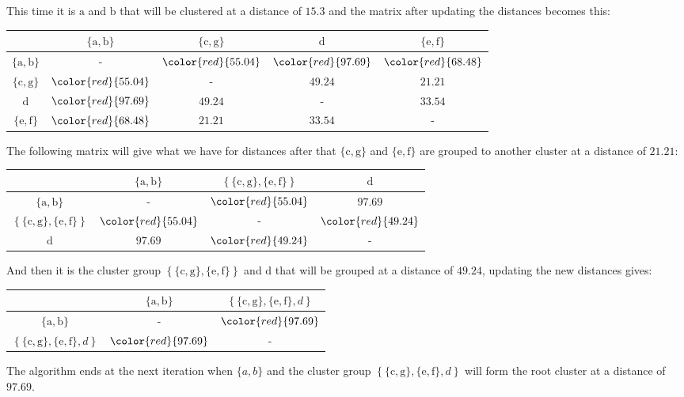 	This time it is $\mathrm{a}$ and $\mathrm{b}$ that will be clustered at a distance of $15.3$ and the matrix after updating the distances becomes this:
	\begin{table}[H]
		\centering
		\begin{tabular}{|c|c|c|c|c|}
		\hline
		 & $\{\mathrm{a},\mathrm{b}\}$ & $\{\mathrm{c},\mathrm{g}\}$ & $\mathrm{d}$ & $\{\mathrm{e},\mathrm{f}\}$ \\ \hline
		$\{\mathrm{a},\mathrm{b}\}$ & - & $\color{red}{55.04}$ & $\color{red}{97.69}$ & $\color{red}{68.48}$ \\ \hline
		$\{\mathrm{c},\mathrm{g}\}$ & $\color{red}{55.04}$ & - & $49.24$ & $21.21$ \\ \hline
		$\mathrm{d}$ & $\color{red}{97.69}$ & $49.24$ & - & $33.54$ \\ \hline
		$\{\mathrm{e},\mathrm{f}\}$ & $\color{red}{68.48}$ & $21.21$ & $33.54$ & - \\ \hline
		\end{tabular}
	\end{table}
	The following matrix will give what we have for distances after that  $\{\mathrm{c}, \mathrm{g}\}$ and $\{\mathrm{e}, \mathrm{f}\}$ are grouped to another cluster at a distance of $21.21$:
	\begin{table}[H]
		\centering
		\begin{tabular}{|c|c|c|c|}
		\hline
		 & $\{\mathrm{a},\mathrm{b}\}$ & $\left\lbrace\{\mathrm{c},\mathrm{g}\},\{\mathrm{e},\mathrm{f}\}\right\rbrace$ & $\mathrm{d}$ \\ \hline
		$\{\mathrm{a},\mathrm{b}\}$ & - & $\color{red}{55.04}$ & $97.69$ \\ \hline
		$\left\lbrace\{\mathrm{c},\mathrm{g}\},\{\mathrm{e},\mathrm{f}\}\right\rbrace$ & $\color{red}{55.04}$ & - & $\color{red}{49.24}$ \\ \hline
		$\mathrm{d}$ & $97.69$ & $\color{red}{49.24}$ & - \\ \hline
		\end{tabular}
	\end{table}
	And then it is the cluster group $\left\lbrace \{\mathrm{c}, \mathrm{g}\}, \{\mathrm{e}, \mathrm{f}\}\right\rbrace$ and $\mathrm{d}$ that will be grouped at a distance of $49.24$, updating the new distances gives:
	\begin{table}[H]
		\centering
		\begin{tabular}{|c|c|c|}
		\hline
		 & $\{\mathrm{a},\mathrm{b}\}$ & $\left\lbrace\{\mathrm{c},\mathrm{g}\},\{\mathrm{e},\mathrm{f}\},d\right\rbrace$ \\ \hline
		$\{\mathrm{a},\mathrm{b}\}$ & - & $\color{red}{97.69}$ \\ \hline
		$\left\lbrace\{\mathrm{c},\mathrm{g}\},\{\mathrm{e},\mathrm{f}\},d\right\rbrace$ & $\color{red}{97.69}$ & - \\ \hline
		\end{tabular}
	\end{table}
	The algorithm ends at the next iteration when $\{a, b\}$ and the cluster group $\left\lbrace \{\mathrm{c}, \mathrm{g}\}, \{\mathrm{e}, \mathrm{f}\},d\right\rbrace$ will form the root cluster at a distance of $97.69$.
	

